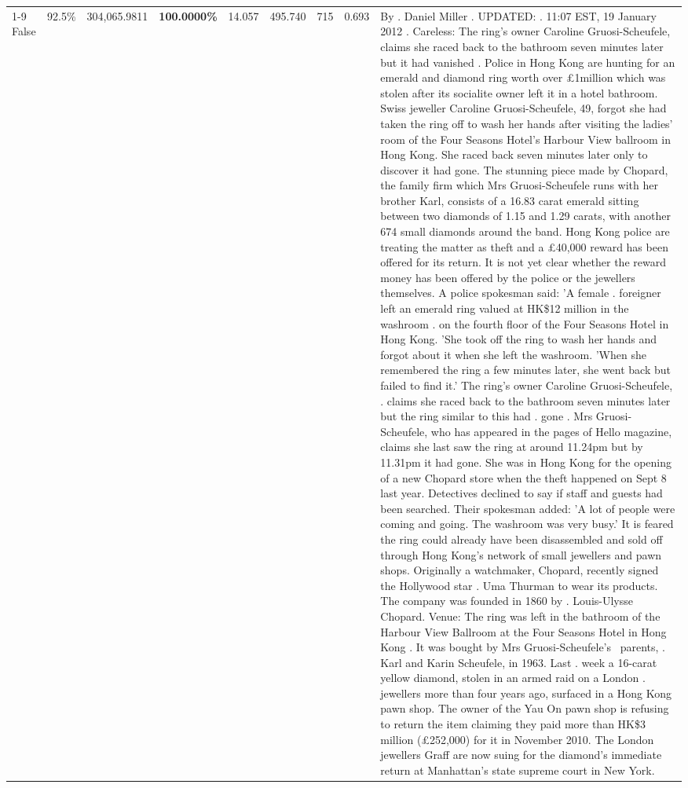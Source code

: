 \begin{table}[H]
\begin{tabular}{lllrlllll}
\cline{1-9}
False & 92.5\% & 304,065.9811 & \bfseries \color{red} 100.0000\% & 14.057 & 495.740 & 715 & 0.693 & By . Daniel Miller . UPDATED: . 11:07 EST, 19 January 2012 . Careless: The ring's owner Caroline Gruosi-Scheufele, claims she raced back to the bathroom seven minutes later but it had vanished . Police in Hong Kong are hunting for an emerald and diamond ring worth over £1million which was stolen after its socialite owner left it in a hotel bathroom. Swiss jeweller Caroline Gruosi-Scheufele, 49, forgot she had taken the ring off to wash her hands after visiting the ladies' room of the Four Seasons Hotel's Harbour View ballroom in Hong Kong. She raced back seven minutes later only to discover it had gone. The stunning piece made by Chopard, the family firm which Mrs Gruosi-Scheufele runs with her brother Karl, consists of a 16.83 carat emerald sitting between two diamonds of 1.15 and 1.29 carats, with another 674 small diamonds around the band. Hong Kong police are treating the matter as theft and a £40,000 reward has been offered for its return. It is not yet clear whether the reward money has been offered by the police or the jewellers themselves. A police spokesman said: 'A female . foreigner left an emerald ring valued at HK\$12 million in the washroom . on the fourth floor of the Four Seasons Hotel in Hong Kong. 'She took off the ring to wash her hands and forgot about it when she left the washroom. 'When she remembered the ring a few minutes later, she went back but failed to find it.' The ring's owner Caroline Gruosi-Scheufele, . claims she raced back to the bathroom seven minutes later but the ring similar to this had . gone . Mrs Gruosi-Scheufele, who has appeared in the pages of Hello magazine, claims she last saw the ring at around 11.24pm but by 11.31pm it had gone. She was in Hong Kong for the opening of a new Chopard store when the theft happened on Sept 8 last year. Detectives declined to say if staff and guests had been searched. Their spokesman added: 'A lot of people were coming and going. The washroom was very busy.' It is feared the ring could already have been disassembled and sold off through Hong Kong's network of small jewellers and pawn shops. Originally a watchmaker, Chopard, recently signed the Hollywood star . Uma Thurman to wear its products. The company was founded in 1860 by . Louis-Ulysse Chopard. Venue: The ring was left in the bathroom of the Harbour View Ballroom at the Four Seasons Hotel in Hong Kong . It was bought by Mrs Gruosi-Scheufele's  parents, . Karl and Karin Scheufele, in 1963. Last . week a 16-carat yellow diamond, stolen in an armed raid on a London . jewellers more than four years ago, surfaced in a Hong Kong pawn shop. The owner of the Yau On pawn shop is refusing to return the item claiming they paid more than HK\$3 million (£252,000) for it in November 2010. The London jewellers Graff are now suing for the diamond’s immediate return at Manhattan’s state supreme court in New York.🎥 \\

\end{tabular}
\end{table}
